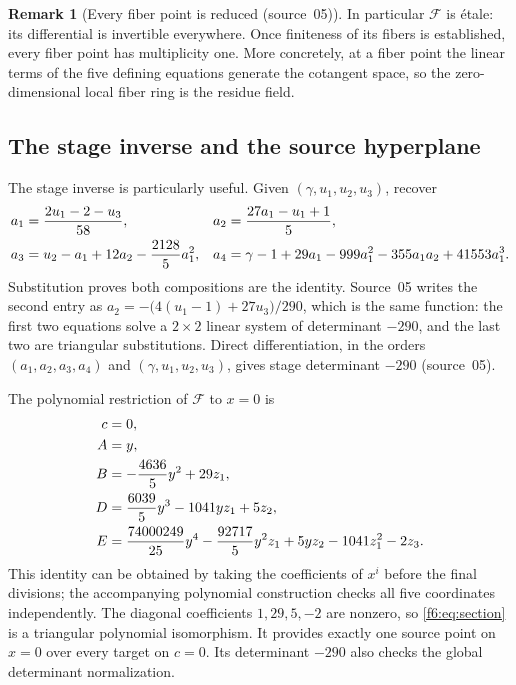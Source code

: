 \documentclass[11pt,a4paper]{article}
\theoremstyle{definition}
\newtheorem{remark}[theorem]{Remark}
\newcommand{\F}{\mathcal F}
\newcommand{\src}[1]{\textup{(source~#1)}}
\begin{document}
\begin{remark}[Every fiber point is reduced \src{05}]\label{f6:kf:rem:etale}
In particular $\F$ is \'etale: its differential is invertible everywhere.
Once finiteness of its fibers is established, every fiber point has
multiplicity one. More concretely, at a fiber point the linear terms of the
five defining equations generate the cotangent space, so the
zero-dimensional local fiber ring is the residue field.
\end{remark}

\subsection{The stage inverse and the source hyperplane}
The stage inverse is particularly useful. Given
$(\gamma,u_1,u_2,u_3)$, recover
\begin{align}
 a_1&=\frac{2u_1-2-u_3}{58},&
 a_2&=\frac{27a_1-u_1+1}{5},\notag\\
 a_3&=u_2-a_1+12a_2-\frac{2128}{5}a_1^2,&
 a_4&=\gamma-1+29a_1-999a_1^2-355a_1a_2+41553a_1^3.
 \label{f6:eq:stageinverse}
\end{align}
Substitution proves both compositions are the identity.
Source~05 writes the second entry as $a_2=-\bigl(4(u_1-1)+27u_3\bigr)/290$,
which is the same function: the first two equations solve a $2\times2$ linear
system of determinant $-290$, and the last two are triangular substitutions.
Direct differentiation, in the orders $(a_1,a_2,a_3,a_4)$ and
$(\gamma,u_1,u_2,u_3)$, gives stage determinant $-290$ \src{05}.

The polynomial restriction of $\F$ to $x=0$ is
\begin{align}
 c&=0,\notag\\
 A&=y,\notag\\
 B&=-\frac{4636}{5}y^2+29z_1,\label{f6:eq:section}\\
 D&=\frac{6039}{5}y^3-1041yz_1+5z_2,\notag\\
 E&=\frac{74000249}{25}y^4-\frac{92717}{5}y^2z_1
       +5yz_2-1041z_1^2-2z_3.\notag
\end{align}
This identity can be obtained by taking the coefficients of $x^i$ before
the final divisions; the accompanying polynomial construction checks all
five coordinates independently. The diagonal coefficients $1,29,5,-2$
are nonzero, so \eqref{f6:eq:section} is a triangular polynomial isomorphism.
It provides exactly one source point on $x=0$ over every target on $c=0$.
Its determinant $-290$ also checks the global determinant normalization.
\end{document}
